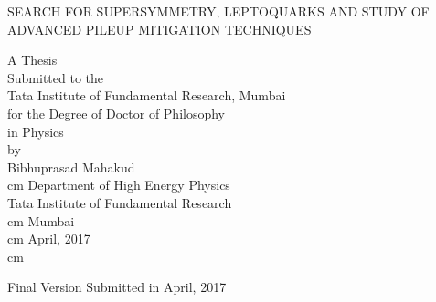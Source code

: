 \thispagestyle{empty}
\begin{center}
{\Large SEARCH FOR SUPERSYMMETRY, LEPTOQUARKS AND STUDY OF ADVANCED PILEUP MITIGATION TECHNIQUES
}
\vskip 1.5cm %
{\large A Thesis \\
\vskip 1.01cm %
Submitted to the\\
\vskip 0.01cm
Tata Institute of Fundamental Research, Mumbai\\
\vskip 0.01cm
for the Degree of Doctor of Philosophy  \\
in Physics\\
\vskip 1.5cm
by\\
{\Large Bibhuprasad Mahakud}\\
\vskip 1.0cm
 cm
Department of High Energy Physics\\
Tata Institute of Fundamental Research \\
 cm
 Mumbai\\
 cm
April, 2017\\
 cm

{\small Final Version Submitted in April, 2017}


}
\end{center}

